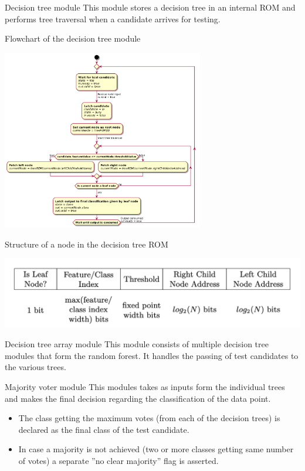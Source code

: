 \documentclass[presentation]{beamer}
\begin{document}
\begin{frame}[label={sec:orgdf07850}]{Decision tree module}
This module stores a decision tree in an internal ROM and performs tree traversal when a candidate arrives for testing.
\end{frame}

\begin{frame}[label={sec:orgd8cf70d}]{Flowchart of the decision tree module}
\begin{center}
\includegraphics[width=250pt]{../schematics/DecisionTree/flow.png}
\end{center}
\end{frame}

\begin{frame}[label={sec:orgfe217d2}]{Structure of a node in the decision tree ROM}
\begin{center}
\includegraphics[width=.9\linewidth]{../schematics/DecisionTree/node-structure.png}
\end{center}
\end{frame}

\begin{frame}[label={sec:org9ff0b97}]{Decision tree array module}
This module consists of multiple decision tree modules that form the random forest. It handles the passing of test candidates to the various trees.
\end{frame}

\begin{frame}[label={sec:orge08c183}]{Majority voter module}
This modules takes as inputs form the individual trees and makes the final decision regarding the classification of the data point.
\begin{itemize}
\item The class getting the maximum votes (from each of the decision trees) is declared as the final class of the test candidate.
\item In case a majority is not achieved (two or more classes getting same number of votes) a separate ”no clear majority” flag is asserted.
\end{itemize}
\end{frame}
\end{document}
